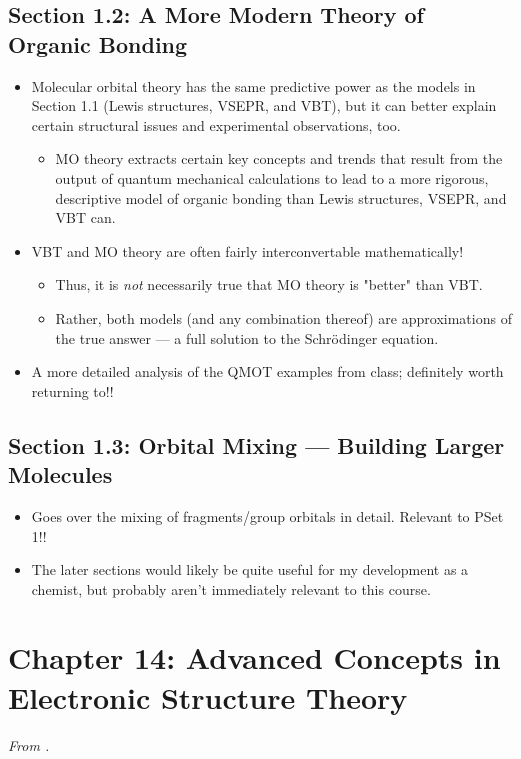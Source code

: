 \documentclass[../notes.tex]{subfiles}
\begin{document}
\subsection*{Section 1.2: A More Modern Theory of Organic Bonding}
\begin{itemize}
    \item Molecular orbital theory has the same predictive power as the models in Section 1.1 (Lewis structures, VSEPR, and VBT), but it can better explain certain structural issues and experimental observations, too.
    \begin{itemize}
        \item MO theory extracts certain key concepts and trends that result from the output of quantum mechanical calculations to lead to a more rigorous, descriptive model of organic bonding than Lewis structures, VSEPR, and VBT can.
    \end{itemize}
    \item VBT and MO theory are often fairly interconvertable mathematically!
    \begin{itemize}
        \item Thus, it is \emph{not} necessarily true that MO theory is "better" than VBT.
        \item Rather, both models (and any combination thereof) are approximations of the true answer --- a full solution to the Schr\"{o}dinger equation.
    \end{itemize}
    \item A more detailed analysis of the QMOT examples from class; definitely worth returning to!!
\end{itemize}


\subsection*{Section 1.3: Orbital Mixing --- Building Larger Molecules}
\begin{itemize}
    \item Goes over the mixing of fragments/group orbitals in detail. Relevant to PSet 1!!
    \item The later sections would likely be quite useful for my development as a chemist, but probably aren't immediately relevant to this course.
\end{itemize}



\section{Chapter 14: Advanced Concepts in Electronic Structure Theory}
\emph{From \textcite{bib:Anslyn}.}
\end{document}

